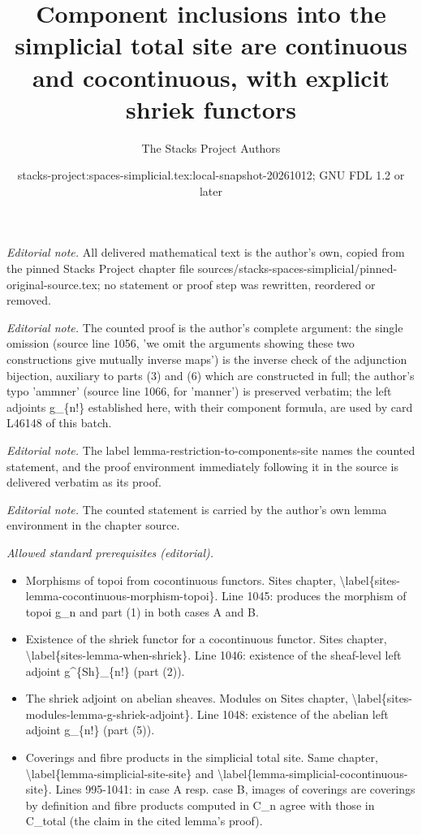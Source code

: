 \documentclass{stacks-project}
\title{Component inclusions into the simplicial total site are continuous and cocontinuous, with explicit shriek functors}
\author{The Stacks Project Authors}
\date{stacks-project:spaces-simplicial.tex:local-snapshot-20261012; GNU FDL 1.2 or later}
\theoremstyle{plain}
\theoremstyle{definition}
\theoremstyle{remark}
\numberwithin{equation}{subsection}
\begin{document}
\maketitle
\noindent\textit{Editorial note.} All delivered mathematical text is the author's own, copied from the pinned Stacks Project chapter file sources/stacks-spaces-simplicial/pinned-original-source.tex; no statement or proof step was rewritten, reordered or removed.\par\medskip
\noindent\textit{Editorial note.} The counted proof is the author's complete argument: the single omission (source line 1056, 'we omit the arguments showing these two constructions give mutually inverse maps') is the inverse check of the adjunction bijection, auxiliary to parts (3) and (6) which are constructed in full; the author's typo 'ammner' (source line 1066, for 'manner') is preserved verbatim; the left adjoints g\_\{n!\} established here, with their component formula, are used by card L46148 of this batch.\par\medskip
\noindent\textit{Editorial note.} The label lemma-restriction-to-components-site names the counted statement, and the proof environment immediately following it in the source is delivered verbatim as its proof.\par\medskip
\noindent\textit{Editorial note.} The counted statement is carried by the author's own lemma environment in the chapter source.\par\medskip
\noindent\textit{Allowed standard prerequisites (editorial).}\begin{itemize}
\item Morphisms of topoi from cocontinuous functors. Sites chapter, \textbackslash{}label\{sites-lemma-cocontinuous-morphism-topoi\}. Line 1045: produces the morphism of topoi g\_n and part (1) in both cases A and B.
\item Existence of the shriek functor for a cocontinuous functor. Sites chapter, \textbackslash{}label\{sites-lemma-when-shriek\}. Line 1046: existence of the sheaf-level left adjoint g\textasciicircum{}\{Sh\}\_\{n!\} (part (2)).
\item The shriek adjoint on abelian sheaves. Modules on Sites chapter, \textbackslash{}label\{sites-modules-lemma-g-shriek-adjoint\}. Line 1048: existence of the abelian left adjoint g\_\{n!\} (part (5)).
\item Coverings and fibre products in the simplicial total site. Same chapter, \textbackslash{}label\{lemma-simplicial-site-site\} and \textbackslash{}label\{lemma-simplicial-cocontinuous-site\}. Lines 995-1041: in case A resp. case B, images of coverings are coverings by definition and fibre products computed in C\_n agree with those in C\_total (the claim in the cited lemma's proof).
\end{itemize}\medskip
\end{document}

